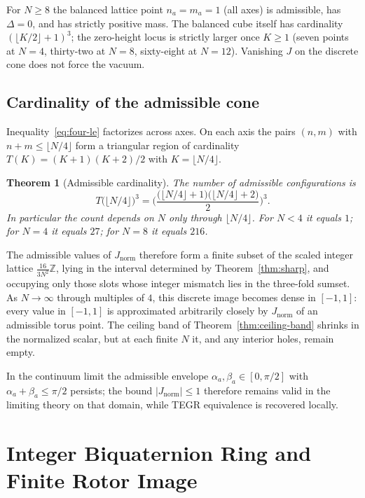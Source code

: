 \documentclass[a4paper]{article}
\newtheorem{theorem}{Theorem}[section]
\theoremstyle{definition}
\newcommand{\Jnorm}{J_{\mathrm{norm}}}
\begin{document}
For $N\geq 8$ the balanced lattice point $n_a=m_a=1$ (all axes) is admissible, has $\Delta=0$, and has strictly positive mass. The balanced cube itself has cardinality $(\lfloor K/2\rfloor+1)^3$; the zero-height locus is strictly larger once $K\geq 1$ (seven points at $N=4$, thirty-two at $N=8$, sixty-eight at $N=12$). Vanishing $J$ on the discrete cone does not force the vacuum.

\subsection{Cardinality of the admissible cone}

Inequality~\eqref{eq:four-le} factorizes across axes. On each axis the pairs $(n,m)$ with $n+m\leq\lfloor N/4\rfloor$ form a triangular region of cardinality $T(K)=(K+1)(K+2)/2$ with $K=\lfloor N/4\rfloor$.

\begin{theorem}[Admissible cardinality]
\label{thm:card}
The number of admissible configurations is
\[
T\bigl(\lfloor N/4\rfloor\bigr)^3=\Biggl(\frac{\bigl(\lfloor N/4\rfloor+1\bigr)\bigl(\lfloor N/4\rfloor+2\bigr)}{2}\Biggr)^3.
\]
In particular the count depends on $N$ only through $\lfloor N/4\rfloor$. For $N<4$ it equals $1$; for $N=4$ it equals $27$; for $N=8$ it equals $216$.
\end{theorem}

The admissible values of $\Jnorm$ therefore form a finite subset of the scaled integer lattice $\frac{16}{3N^2}\mathbb{Z}$, lying in the interval determined by Theorem~\ref{thm:sharp}, and occupying only those slots whose integer mismatch lies in the three-fold sumset. As $N\to\infty$ through multiples of $4$, this discrete image becomes dense in $[-1,1]$: every value in $[-1,1]$ is approximated arbitrarily closely by $\Jnorm$ of an admissible torus point. The ceiling band of Theorem~\ref{thm:ceiling-band} shrinks in the normalized scalar, but at each finite $N$ it, and any interior holes, remain empty.

In the continuum limit the admissible envelope $\alpha_a,\beta_a\in[0,\pi/2]$ with $\alpha_a+\beta_a\leq\pi/2$ persists; the bound $|\Jnorm|\leq 1$ therefore remains valid in the limiting theory on that domain, while TEGR equivalence is recovered locally.

\section{Integer Biquaternion Ring and Finite Rotor Image}
\label{sec:integer}
\end{document}

